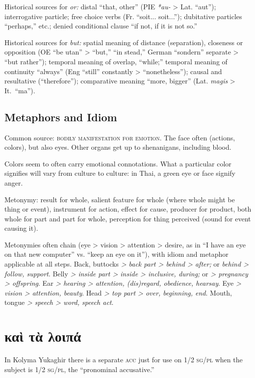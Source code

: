 \documentclass[11pt]{article}
\newcommand{\I}[1]{\textsc{#1}}   %
\begin{document}
Historical sources for \textit{or:} distal ``that, other'' (PIE
\textit{*au-} > Lat. ``aut''); interrogative particle; free choice
verbs (Fr. ``soit... soit...''); dubitative particles ``perhaps,''
etc.; denied conditional clause ``if not, if it is not so.''

Historical sources for \textit{but:} spatial meaning of distance
(separation), closeness or opposition (OE ``be utan'' > ``but,'' ``in
stead,'' German ``sondern'' separate > ``but rather''); temporal
meaning of overlap, ``while;'' temporal meaning of continuity
``always'' (Eng ``still'' constantly > ``nonetheless''); causal and
resultative (``therefore''); comparative meaning ``more, bigger''
(Lat. \textit{magis} > It.\ ``ma'').

\subsection{Metaphors and Idiom}
Common source: \I{bodily manifestation for emotion}. The face often
(actions, colors), but also eyes. Other organs get up to shenanigans,
including blood.

Colors seem to often carry emotional connotations.  What a
particular color signifies will vary from culture to culture: in Thai,
a green eye or face signify anger.

Metonymy: result for whole, salient feature for whole (where whole
might be thing or event), instrument for action, effect for cause,
producer for product, both whole for part and part for whole,
perception for thing perceived (sound for event causing it).

Metonymies often chain (eye > vision > attention > desire, as in ``I
have an eye on that new computer'' vs. ``keep an eye on it''), with
idiom and metaphor applicable at all steps.  Back, buttocks \textit{>
back part > behind > after;} or \textit{behind > follow, support}.
Belly \textit{> inside part > inside > inclusive, during;} or
\textit{> pregnancy > offspring}.  Ear \textit{> hearing > attention,
(dis)regard, obedience, hearsay}.  Eye \textit{> vision > attention,
beauty}.  Head \textit{> top part > over, beginning, end}.  Mouth,
tongue \textit{> speech > word, speech act}.




\section{καὶ τὰ λοιπά}
In Kolyma Yukaghir there is a separate \I{acc} just for use on \I{1/2
sg/pl} when the subject is \I{1/2 sg/pl}, the ``pronominal
accusative.'' 
\end{document}
